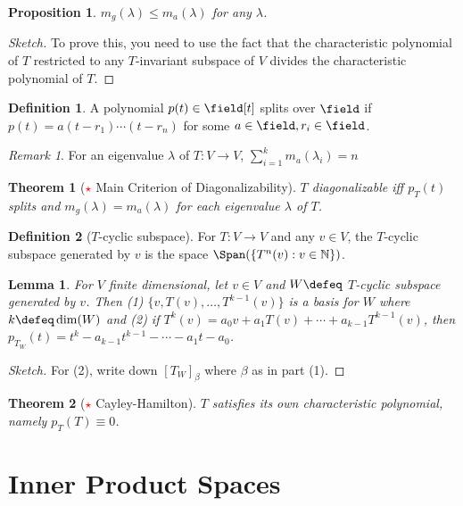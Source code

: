 \documentclass[12pt, oneside]{article}
\theoremstyle{definition}
\newtheorem{defn}{Definition}
\theoremstyle{plain}
\newtheorem{thm}{Theorem}
\newtheorem{prop}{Proposition}
\newtheorem{lemma}{Lemma}
\theoremstyle{remark}
\newtheorem{remark}{Remark}
\let\origsection=\section
\renewcommand\section[1]{\origsection{#1}\label{sec:\thesection}}
\begin{document}
\begin{prop}
  $m_g(\lambda) \leq m_a(\lambda)$ for any $\lambda$.
\end{prop}

\begin{proof}[Sketch]
  To prove this, you need to use the fact that the characteristic polynomial of $T$ restricted to any $T$-invariant subspace of $V$ divides the characteristic polynomial of $T$.
\end{proof}
\begin{defn}
  A polynomial $p(t) \in \field[t]$ splits over $\field$ if $p(t) = a (t-r_1)\cdots(t-r_n)$ for some $a \in \field, r_i \in \field$.
\end{defn}
\begin{remark}
  For an eigenvalue $\lambda$ of $T : V \to V$, $\sum_{i=1}^k m_a(\lambda_i) = n$
\end{remark}
\begin{thm}[\textcolor{red}{$\star$} Main Criterion of Diagonalizability]
  $T$ diagonalizable iff $p_T(t)$ splits and $m_g(\lambda) = m_a(\lambda)$ for each eigenvalue $\lambda$ of $T$.
\end{thm}

\begin{defn}[$T$-cyclic subspace]
  For $T : V \to V$ and any $v \in V$, the $T$-cyclic subspace generated by $v$ is the space $\Span(\{T^n(v) : v \in \mathbb{N}\})$.
\end{defn}

\begin{lemma}
  For $V$ finite dimensional, let $v \in V$ and $W \defeq$ $T$-cyclic subspace generated by $v$. Then (1) $\{v, T(v), \dots, T^{k-1}(v)\}$ is a basis for $W$ where $k \defeq \dim(W)$ and (2) if $T^{k}(v) = a_0 v + a_1 T(v) + \cdots + a_{k-1}T^{k-1}(v)$, then $p_{T_W}(t) = t^k - a_{k-1}t^{k-1} - \cdots - a_1 t - a_0$.
\end{lemma}

\begin{proof}[Sketch]
  For (2), write down $[T_W]_\beta$ where $\beta$ as in part (1).
\end{proof}

\begin{thm}[\textcolor{red}{$\star$} Cayley-Hamilton]
  $T$ satisfies its own characteristic polynomial, namely $p_T(T) \equiv 0$.
\end{thm}

\section{Inner Product Spaces}
\end{document}

